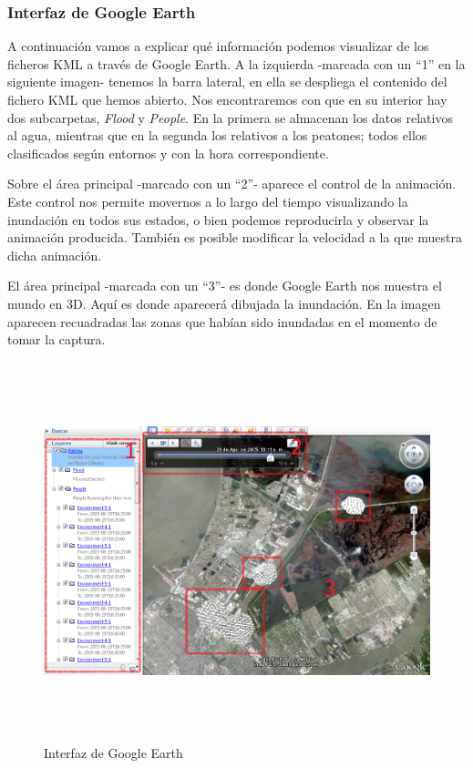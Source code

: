\subsubsection{Interfaz de Google Earth}

A continuación vamos a explicar qué información podemos visualizar de los
ficheros KML a través de Google Earth. A la izquierda -marcada con un ``1'' en
la siguiente imagen- tenemos la barra lateral, en ella se despliega el
contenido del fichero KML que hemos abierto. Nos encontraremos con que en su
interior hay dos subcarpetas, {\em Flood} y {\em People}. En la primera se
almacenan los datos relativos al agua, mientras que en la segunda los relativos
a los peatones; todos ellos clasificados según entornos y con la hora
correspondiente.

Sobre el área principal -marcado con un ``2''- aparece el control de la
animación. Este control nos permite movernos a lo largo del tiempo visualizando
la inundación en todos sus estados, o bien podemos reproducirla y observar la
animación producida. También es posible modificar la velocidad a la que
muestra dicha animación.

El área principal -marcada con un ``3''- es donde Google Earth nos muestra el
mundo en 3D. Aquí es donde aparecerá dibujada la inundación. En la imagen
aparecen recuadradas las zonas que habían sido inundadas en el momento de tomar
la captura.

\begin{figure}[H]
 \centering
 \includegraphics[height=110mm,angle=90]{figuras/cap6/resultados/interfaz.png}
 \caption{Interfaz de Google Earth}
\end{figure}

